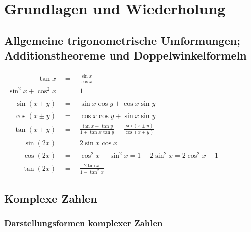 \documentclass[12pt, a4paper]{scrreprt}
\begin{document}

\tableofcontents
\clearpage

\chapter{Grundlagen und Wiederholung}

\section{Allgemeine trigonometrische Umformungen; Additionstheoreme und Doppelwinkelformeln}

\bgroup
\def\arraystretch{1.5}
\begin{center}
  \begin{tabularx}{.7\textwidth}{rXl}
    \(\tan x\) & \(=\) & \(\frac{\sin x}{\cos x}\)\\
    \(\sin ^2 x + \cos ^2 x\) & \(=\) & \(1\)\\[1em]
    \(\sin ( x \pm y )\) & \(=\) & \(\sin x \cos y \pm \cos x \sin y\)\\
    \(\cos ( x \pm y )\) & \(=\) & \(\cos x \cos y \mp \sin x \sin y\)\\
    \(\tan ( x \pm y )\) & \(=\) & \(\frac{\tan x \pm \tan y}{1 \mp \tan x \tan y} = \frac{\sin ( x \pm y )}{\cos ( x \pm y )}\)\\[1em]
    \(\sin (2x)\) & \(=\) &  \(2 \sin x \cos x\)\\
    \(\cos (2x)\) & \(=\) & \(\cos ^2 x - \sin ^2 x = 1 - 2 \sin ^2 x = 2 \cos ^2 x - 1\)\\
    \(\tan (2x)\) & \(=\) & \(\frac{2 \tan x}{1 - \tan ^2 x}\)
  \end{tabularx}
\end{center}
\egroup

\section{Komplexe Zahlen}

\subsection{Darstellungsformen komplexer Zahlen}
\end{document}
